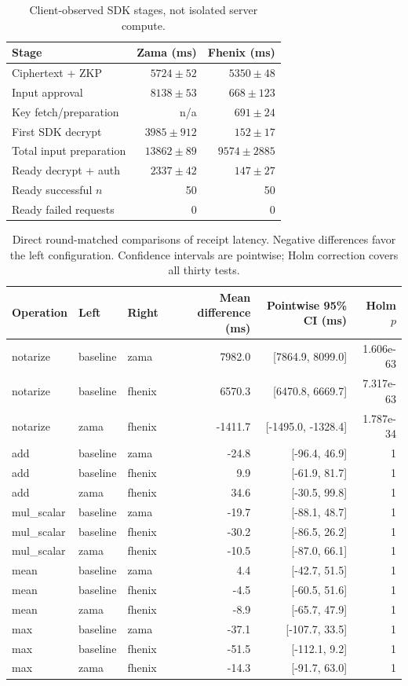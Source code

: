 \begin{table}[!t]
\centering\footnotesize
\caption{Client-observed SDK stages, not isolated server compute.}
\label{tab:lifecycle-sdk-stages}
\begin{tabular}{lrr}
\hline
Stage & Zama (ms) & Fhenix (ms) \\
\hline
Ciphertext + ZKP & \(5724 \pm 52\) & \(5350 \pm 48\) \\
Input approval & \(8138 \pm 53\) & \(668 \pm 123\) \\
Key fetch/preparation & n/a & \(691 \pm 24\) \\
First SDK decrypt & \(3985 \pm 912\) & \(152 \pm 17\) \\
Total input preparation & \(13862 \pm 89\) & \(9574 \pm 2885\) \\
Ready decrypt + auth & \(2337 \pm 42\) & \(147 \pm 27\) \\
Ready successful $n$ & 50 & 50 \\
Ready failed requests & 0 & 0 \\
\hline
\end{tabular}
\end{table}

\begin{table}[!t]
\centering\footnotesize
\caption{Direct round-matched comparisons of receipt latency. Negative differences favor the left configuration. Confidence intervals are pointwise; Holm correction covers all thirty tests.}
\label{tab:lifecycle-comparisons-confirmationMs}
\begin{tabular}{lllrrr}
\hline
Operation & Left & Right & Mean difference (ms) & Pointwise 95\% CI (ms) & Holm $p$ \\
\hline
notarize & baseline & zama & 7982.0 & [7864.9, 8099.0] & 1.606e-63 \\
notarize & baseline & fhenix & 6570.3 & [6470.8, 6669.7] & 7.317e-63 \\
notarize & zama & fhenix & -1411.7 & [-1495.0, -1328.4] & 1.787e-34 \\
add & baseline & zama & -24.8 & [-96.4, 46.9] & 1 \\
add & baseline & fhenix & 9.9 & [-61.9, 81.7] & 1 \\
add & zama & fhenix & 34.6 & [-30.5, 99.8] & 1 \\
mul\_scalar & baseline & zama & -19.7 & [-88.1, 48.7] & 1 \\
mul\_scalar & baseline & fhenix & -30.2 & [-86.5, 26.2] & 1 \\
mul\_scalar & zama & fhenix & -10.5 & [-87.0, 66.1] & 1 \\
mean & baseline & zama & 4.4 & [-42.7, 51.5] & 1 \\
mean & baseline & fhenix & -4.5 & [-60.5, 51.6] & 1 \\
mean & zama & fhenix & -8.9 & [-65.7, 47.9] & 1 \\
max & baseline & zama & -37.1 & [-107.7, 33.5] & 1 \\
max & baseline & fhenix & -51.5 & [-112.1, 9.2] & 1 \\
max & zama & fhenix & -14.3 & [-91.7, 63.0] & 1 \\
\hline
\end{tabular}
\end{table}

